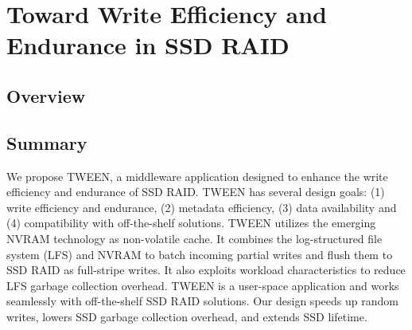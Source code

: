 \chapter{Toward Write Efficiency and Endurance in SSD RAID}
\label{chap:tween}

\section{Overview}




\section{Summary}

We propose TWEEN, a middleware application designed to enhance the write
efficiency and endurance of SSD RAID. TWEEN has several design goals: (1)
write efficiency and endurance, (2) metadata efficiency, (3) data availability
and (4) compatibility with off-the-shelf solutions. TWEEN utilizes the
emerging NVRAM technology as non-volatile cache.  It combines the
log-structured file system (LFS) and NVRAM to batch incoming partial writes
and flush them to SSD RAID as full-stripe writes.  It also exploits workload
characteristics to reduce LFS garbage collection overhead.  TWEEN is a
user-space application and works seamlessly with off-the-shelf SSD RAID
solutions. Our design speeds up random writes, lowers SSD garbage collection 
overhead, and extends SSD lifetime.
